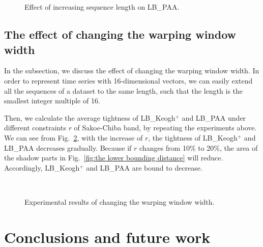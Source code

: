 \documentclass[10pt,journal,compsoc]{IEEEtran}
\begin{document}
\begin{figure}[!htbp]
\centering
{}
~\\
~
\caption{Effect of increasing sequence length on LB\_PAA.}
\label{fig:Effect of increasing length on LBPAA}
\end{figure}


\subsection{The effect of changing the warping window width}

In the subsection, we discuss the effect of changing the warping window width.
In order to represent time series with 16-dimensional vectors,
we can easily extend all the sequences of a dataset to the same length,
such that the length is the smallest integer multiple of 16.

Then, we calculate the average tightness of LB\_Keogh$^+$ and LB\_{PAA} under different constraints $r$ of Sakoe-Chiba band,
by repeating the experiments above.
We can see from Fig.~\ref{fig:change the warping window width},
with the increase of $r$, the tightness of LB\_Keogh$^+$ and LB\_{PAA} decreases gradually.
Because if $r$ changes from 10\%  to 20\%,
the area of the shadow parts in Fig.~\ref{fig:the lower bounding distance} will reduce.
Accordingly, LB\_Keogh$^+$ and LB\_{PAA} are bound to decrease.

\begin{figure}[!htbp]
\centering
{}
~\\
\caption{Experimental results of changing the warping window width.}
\label{fig:change the warping window width}
\end{figure}


\section{Conclusions and future work}\label{sec:conclusions}
\end{document}
